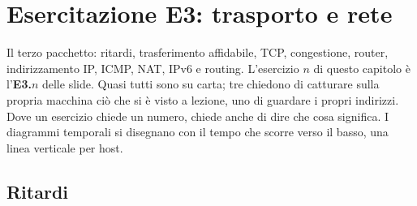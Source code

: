 \chapter{Esercitazione E3: trasporto e rete}

Il terzo pacchetto: ritardi, trasferimento affidabile, TCP, congestione, router, indirizzamento IP, ICMP, NAT, IPv6 e routing.
L'esercizio $n$ di questo capitolo è l'\textbf{E3.$n$} delle slide. Quasi tutti sono su carta; tre chiedono di catturare sulla propria
macchina ciò che si è visto a lezione, uno di guardare i propri indirizzi. Dove un esercizio chiede un numero, chiede anche di dire che cosa
significa. I diagrammi temporali si disegnano con il tempo che scorre verso il basso, una linea verticale per host.


\section{Ritardi}

